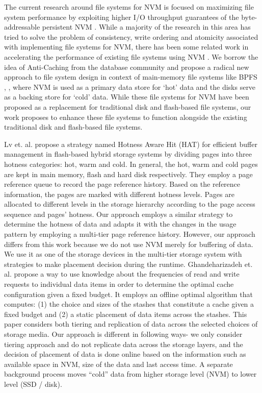 The current research around file systems for NVM is focused on maximizing file system performance by exploiting higher I/O throughput guarantees of the byte-addressable persistent NVM \cite{c10,c8,c3,c5}. While a majority of the research in this area has tried to solve the problem of consistency, write ordering and atomicity associated with implementing file systems for NVM, there has been some related work in accelerating the performance of existing file systems using NVM \cite{c11, c12}. We borrow the idea of Anti-Caching \cite{c13} from the database community and propose a radical new approach to file system design in context of main-memory file systems like BPFS \cite{c10}, \cite{c8}, where NVM is used as a primary data store for ‘hot’ data and the disks serve as a backing store for ‘cold’ data. While these file systems for NVM have been proposed as a replacement for traditional disk and flash-based file systems, our work proposes to enhance these file systems to function alongside the existing traditional disk and flash-based file systems. 

Lv et. al. \cite{c1} propose a strategy named Hotness Aware Hit (HAT) for efficient buffer management in flash-based hybrid storage systems by dividing pages into three hotness categories: hot, warm and cold. In general, the hot, warm and cold pages are kept in main memory, flash and hard disk respectively. They employ a page reference queue to record the page reference history. Based on the reference information, the pages are marked with different hotness levels. Pages are allocated to different levels in the storage hierarchy according to the page access sequence and pages’ hotness. Our approach employs a similar strategy to determine the hotness of data and adapts it with the changes in the usage pattern by employing a multi-tier page reference history. However, our approach differs from this work because we do not use NVM merely for buffering of data. We use it as one of the storage devices in the multi-tier storage system with strategies to make placement decision during the runtime. Ghandeharizadeh et. al. \cite{c2} propose a way to use knowledge about the frequencies of read and write requests to individual data items in order to determine the optimal cache configuration given a fixed budget. It employs an offline optimal algorithm that computes: (1) the choice and sizes of the stashes that constitute a cache given a fixed budget and (2) a static placement of data items across the stashes. This paper considers both tiering and replication of data across the selected choices of storage media. Our approach is different in following ways- we only consider tiering approach and do not replicate data across the storage layers, and the decision of placement of data is done online based on the information such as available space in NVM, size of the data and last access time. A separate background process moves “cold” data from higher storage level (NVM) to lower level (SSD / disk).  
